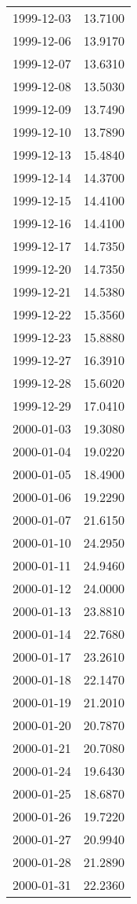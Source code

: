 \begin{tabular}{lr}
1999-12-03 &     13.7100 \\
1999-12-06 &     13.9170 \\
1999-12-07 &     13.6310 \\
1999-12-08 &     13.5030 \\
1999-12-09 &     13.7490 \\
1999-12-10 &     13.7890 \\
1999-12-13 &     15.4840 \\
1999-12-14 &     14.3700 \\
1999-12-15 &     14.4100 \\
1999-12-16 &     14.4100 \\
1999-12-17 &     14.7350 \\
1999-12-20 &     14.7350 \\
1999-12-21 &     14.5380 \\
1999-12-22 &     15.3560 \\
1999-12-23 &     15.8880 \\
1999-12-27 &     16.3910 \\
1999-12-28 &     15.6020 \\
1999-12-29 &     17.0410 \\
2000-01-03 &     19.3080 \\
2000-01-04 &     19.0220 \\
2000-01-05 &     18.4900 \\
2000-01-06 &     19.2290 \\
2000-01-07 &     21.6150 \\
2000-01-10 &     24.2950 \\
2000-01-11 &     24.9460 \\
2000-01-12 &     24.0000 \\
2000-01-13 &     23.8810 \\
2000-01-14 &     22.7680 \\
2000-01-17 &     23.2610 \\
2000-01-18 &     22.1470 \\
2000-01-19 &     21.2010 \\
2000-01-20 &     20.7870 \\
2000-01-21 &     20.7080 \\
2000-01-24 &     19.6430 \\
2000-01-25 &     18.6870 \\
2000-01-26 &     19.7220 \\
2000-01-27 &     20.9940 \\
2000-01-28 &     21.2890 \\
2000-01-31 &     22.2360 \\

\end{tabular}

